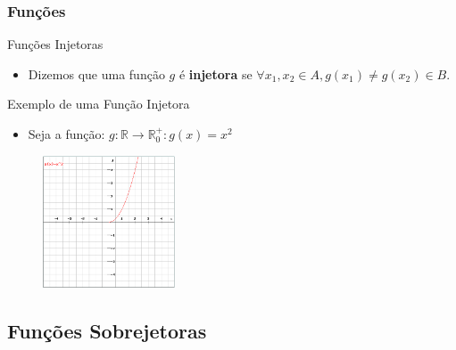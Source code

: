 \documentclass{beamer}
\begin{document}
\begin{frame}
\frametitle{Funções}

	\begin{block}{Funções Injetoras}
		\begin{itemize}
			\item<1-> Dizemos que uma função $g$ é \textbf{injetora} se $ \forall x_1,x_2 \in A, g(x_1) \neq g(x_2) \in B$.
		\end{itemize}
	\end{block}
	
	\begin{block}{Exemplo de uma Função Injetora}
		\begin{itemize}
			\item Seja a função: $g: \mathbb{R} \to \mathbb{R}_0^+ : g(x) = x^2$
		\end{itemize}
	\end{block}
	\begin{figure}[!h]
			\begin{center}
			\includegraphics[width=0.35\textwidth]{Figures/g}
			\end{center}
	\end{figure}	
	
\end{frame}


\subsection{Funções Sobrejetoras}
\end{document}
